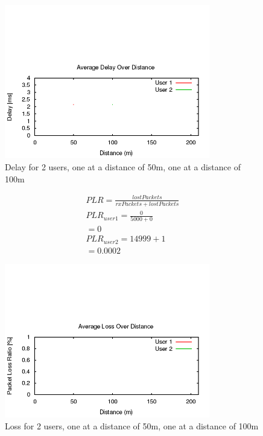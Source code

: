 \begin{figure}[H]
	\centering
	\includegraphics[width=0.8\textwidth]{images/EE500/QC/P1/Images/wifi-delay}
	\caption{Delay for 2 users, one at a distance of 50m, one at a distance
	of 100m}
	\label{fig:QCP1delay}
\end{figure}

\begin{gather*}
	PLR=\frac{lostPackets}{rxPackets+lostPackets} \\
	PLR_{user 1}=\frac{0}{5000+0} \\
	= 0 \\
	PLR_{user 2}={1}{4999+1} \\
	= 0.0002
\end{gather*}

\begin{figure}[H]
	\centering
	\includegraphics[width=0.8\textwidth]{images/EE500/QC/P1/Images/wifi-loss}
	\caption{Loss for 2 users, one at a distance of 50m, one at a distance
	of 100m}
	\label{fig:QCP1loss}
\end{figure}
